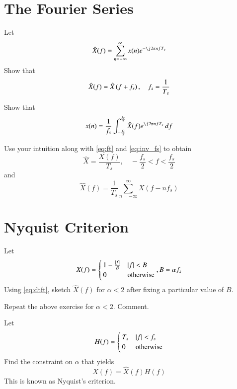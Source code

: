 \documentclass[journal,12pt,twocolumn]{IEEEtran}
\begin{document}
\section{The Fourier Series}
\begin{problem}
Let
\begin{equation}
\hat{X}(f) = \sum_{n=-\infty}^{\infty}x(n)e^{-\j 2\pi nfT_s}
\end{equation}
%
Show that 
\begin{equation}
\hat{X}(f) = \hat{X}\left(f+f_s\right), \quad f_s = \frac{1}{T_s}
\end{equation}
\end{problem}
%
\begin{problem}
Show that
\begin{equation}
\label{eq:inv_fs}
x(n) = \frac{1}{f_s}\int_{-\frac{f_s}{2}}^{\frac{f_s}{2}}\hat{X}(f)e^{\j 2\pi nfT_s}\, df
\end{equation}
\end{problem}
\begin{problem}
Use your intuition along with  \eqref{eq:ft} and \eqref{eq:inv_fs} to obtain
\begin{equation}
\hat{X} = \frac{X(f)}{T_s}, \quad -\frac{f_s}{2} < f < \frac{f_s}{2}
\end{equation}
and
\begin{equation}
\label{eq:dtft}
\hat{X}(f) = \frac{1}{T_s}\sum_{n=-\infty}^{\infty}X(f-nf_s)
\end{equation}
\end{problem}
\section{Nyquist Criterion}
\begin{problem}
Let 
\begin{equation}
X(f) = 
\begin{cases}
1 - \frac{\left\vert f\right\vert}{B} & \left\vert f\right\vert < B
\\
0 & \text{otherwise}
\end{cases},
B = \alpha f_s
\end{equation}
Using \eqref{eq:dtft},  sketch $\hat{X}(f)$ for $\alpha < 2$ after fixing a particular value of $B$. 
\end{problem}
\begin{problem}
Repeat the above exercise for $\alpha < 2$.  Comment.  
\end{problem}
\begin{problem}
Let 
\begin{equation}
H(f) = 
\begin{cases}
T_s & \left\vert f\right\vert < f_s
\\
0 & \text{otherwise}
\end{cases}
\end{equation}
Find the constraint on $\alpha$ that yields
\begin{equation}
X(f) = \hat{X}(f) H(f)
\end{equation}
This is known as Nyquist's criterion.
\end{problem}
\end{document}
